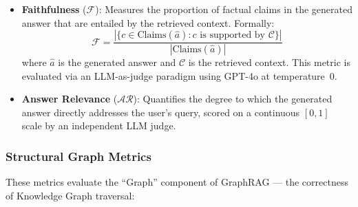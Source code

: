 \begin{itemize}
    \item \textbf{Faithfulness} ($\mathcal{F}$): Measures the proportion of factual claims in the generated answer that are entailed by the retrieved context. Formally:
    \begin{equation}
        \mathcal{F} = \frac{|\{c \in \text{Claims}(\hat{a}) : c \text{ is supported by } \mathcal{C}\}|}{|\text{Claims}(\hat{a})|}
    \end{equation}
    where $\hat{a}$ is the generated answer and $\mathcal{C}$ is the retrieved context. This metric is evaluated via an LLM-as-judge paradigm using GPT-4o at temperature~0.

    \item \textbf{Answer Relevance} ($\mathcal{AR}$): Quantifies the degree to which the generated answer directly addresses the user's query, scored on a continuous $[0, 1]$ scale by an independent LLM judge.
\end{itemize}

\subsubsection{Structural Graph Metrics}

These metrics evaluate the ``Graph'' component of GraphRAG — the correctness of Knowledge Graph traversal:

